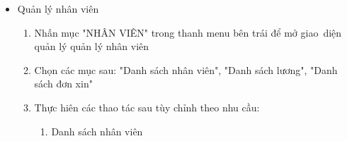\documentclass[a4paper,12pt]{report}
\begin{document}
\begin{itemize}
\begin{itemize}
\begin{enumerate}[label=B\arabic*:]
\begin{enumerate}[label=B3.\arabic*:]
\begin{itemize}
                                    \item Reset lại trang thì nhấn icon ở phía trên gần icon tìm kiếm
                                    \item Nhập số lượng sản phẩm, các thông tin liên quan đến sản phẩm nằm ở bên phải sau đó nhấn nút xác nhận "OK" để thực hiện các bước tiếp theo để tạo phiếu xuất
                                    \item Sửa số lượng: Chọn sản phẩm trong danh sách bên phải để chỉnh sửa
                                    \item Xóa sản phẩm: Chọn 1 dòng sản phẩm để xóa. Hệ thống sẽ xác nhận lại có xóa không, sau đó sẽ thực hiện xóa
                                    \item Xuất hàng: Khi nhấn nút "Xuất hàng" sẽ hệ sẽ xác nhận và thực hiện nhập hàng
                                \end{itemize}
                          \item Phiếu xuất
                                \begin{itemize}
                                    \item Tìm kiếm phiếu xuất cần xem và nhấn icon tìm kiếm
                                    \item Chọn 1 dòng phiếu xuất thông tin chi tiết của phiếu xuất sẽ hiện ở phía bên phải để xem thông tin chi tiết của phiếu xuất
                                \end{itemize}
                      \end{enumerate}
            \end{enumerate}
              \item Quản lý nhân viên
                    \begin{enumerate}[label=B\arabic*:]
                        \item Nhấn mục "NHÂN VIÊN" trong thanh menu bên trái để mở giao~diện quản lý quản lý nhân viên
                        \item Chọn các mục sau: "Danh sách nhân viên", "Danh sách lương", "Danh sách đơn xin"
                        \item Thực hiên các thao tác sau tùy chỉnh theo nhu cầu:
                              \begin{enumerate}[label=B3.\arabic*:]
                                  \item Danh sách nhân viên
                                        \begin{itemize}

\end{itemize}
\end{enumerate}
\end{enumerate}
\end{itemize}
\end{itemize}
\end{document}
